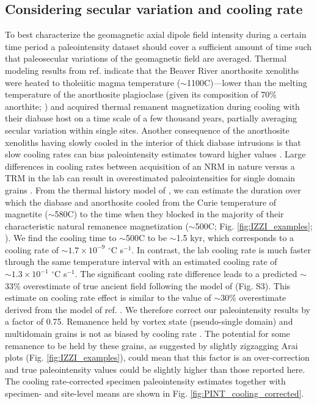 \documentclass[9pt,twocolumn,twoside,lineno]{pnas-new}
\begin{document}
\subsection*{Considering secular variation and cooling rate}
To best characterize the geomagnetic axial dipole field intensity during a certain time period a paleointensity dataset should cover a sufficient amount of time such that paleosecular variations of the geomagnetic field are averaged. Thermal modeling results from ref. \citealp{Zhang2021b} indicate that the Beaver River anorthosite xenoliths were heated to tholeiitic magma temperature ($\sim$1100\textdegree C)---lower than the melting temperature of the anorthosite plagioclase (given its composition of 70\% anorthite; \citealp{Morrison1983a, Doyle2016a}) and acquired thermal remanent magnetization during cooling with their diabase host on a time scale of a few thousand years, partially averaging secular variation within single sites. Another consequence of the anorthosite xenoliths having slowly cooled in the interior of thick diabase intrusions is that slow cooling rates can bias paleointensity estimates toward higher values \cite{Halgedahl1980a}. Large differences in cooling rates between acquisition of an NRM in nature versus a TRM in the lab can result in overestimated paleointensities for single domain grains \cite{Dodson1980a, Halgedahl1980a, Nagy2021a}. From the thermal history model of \cite{Zhang2021b}, we can estimate the duration over which the diabase and anorthosite cooled from the Curie temperature of magnetite ($\sim$580\textdegree C) to the time when they blocked in the majority of their characteristic natural remanence magnetization ($\sim$500\textdegree  C; Fig. \ref{fig:IZZI_examples}; \citealp{Zhang2021b}). We find the cooling time to $\sim$500\textdegree C to be $\sim$1.5 kyr, which corresponds to a cooling rate of $\sim1.7\times10^{-9}$ $^\circ$C s$^{-1}$. In contrast, the lab cooling rate is much faster through the same temperature interval with an estimated cooling rate of $\sim1.3\times10^{-1}$ $^\circ$C s$^{-1}$. The significant cooling rate difference leads to a predicted $\sim$33\% overestimate of true ancient field following the model of \citealp{Halgedahl1980a} (Fig. S3). This estimate on cooling rate effect is similar to the value of $\sim$30\% overestimate derived from the model of ref. \citealp{Nagy2021a}. We therefore correct our paleointensity results by a factor of 0.75. Remanence held by vortex state (pseudo-single domain) and multidomain grains is not as biased by cooling rate \cite{Biggin2013a}. The potential for some remanence to be held by these grains, as suggested by slightly zigzagging Arai plots (Fig. \ref{fig:IZZI_examples}), could mean that this factor is an over-correction and true paleointensity values could be slightly higher than those reported here. The cooling rate-corrected specimen paleointensity estimates together with specimen- and site-level means are shown in Fig. \ref{fig:PINT_cooling_corrected}.
\end{document}
